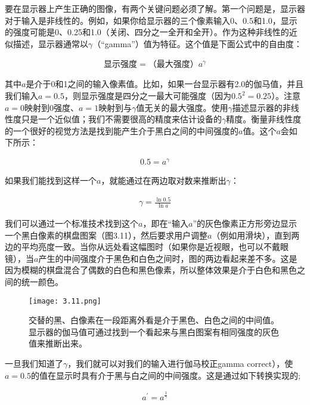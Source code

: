 \documentclass[lang=cn,12pt]{elegantbook}
\begin{document}
要在显示器上产生正确的图像，有两个关键问题必须了解。第一个问题是，显示器对于输入是非线性的。例如，如果你给显示器的三个像素输入0、0.5和1.0，显示的强度可能是0、0.25和1.0（关闭、四分之一全开和全开）。作为这种非线性的近似描述，显示器通常以$\gamma $（“gamma”）值为特征。这个值是下面公式中的自由度：

\begin{align}
  \mbox{显示强度}=\mbox{（最大强度）}a^\gamma
\end{align}

其中$a$是介于0和1之间的输入像素值。比如，如果一台显示器有2.0的伽马值，并且我们输入$a=0.5$，则显示强度是四分之一最大可能强度（因为$0.5^2=0.25$）。注意$a=0$映射到0强度、$a=1$映射到与$\gamma$值无关的最大强度。使用$\gamma$描述显示器的非线性度只是一个近似值；我们不需要很高的精度来估计设备的$\gamma$精度。衡量非线性度的一个很好的视觉方法是找到能产生介于黑白之间的中间强度的$a$值。这个$a$会如下所示：

\[
  \begin{aligned}
    0.5 = a^\gamma
  \end{aligned}
\]

如果我们能找到这样一个$a$，就能通过在两边取对数来推断出$\gamma$：

\[
  \begin{aligned}
    \gamma = \frac{\ln 0.5}{\ln a}
  \end{aligned}
\]

我们可以通过一个标准技术找到这个$a$，即在“输入$a$”的灰色像素正方形旁边显示一个黑白像素的棋盘图案（图3.11），然后要求用户调整$a$（例如用滑块），直到两边的平均亮度一致。当你从远处看这幅图时（如果你是近视眼，也可以不戴眼镜），当$a$产生的中间强度介于黑色和白色之间时，图的两边看起来差不多。这是因为模糊的棋盘混合了偶数的白色和黑色像素，所以整体效果是介于白色和黑色之间的统一颜色。

\begin{figure}[htb]
  \centering
  \texttt{[image: 3.11.png]}
  \caption{交替的黑、白像素在一段距离外看是介于黑色、白色之间的中间值。显示器的伽马值可通过找到一个看起来与黑白图案有相同强度的灰色值来推断出来。}
\end{figure}

一旦我们知道了$\gamma$，我们就可以对我们的输入进行伽马校正gamma correct），使$a=0.5$的值在显示时具有介于黑与白之间的中间强度。这是通过如下转换实现的;

\[
  \begin{aligned}
    a^{'} = a^{\frac{1}{\gamma } }
  \end{aligned}
\]
\end{document}
